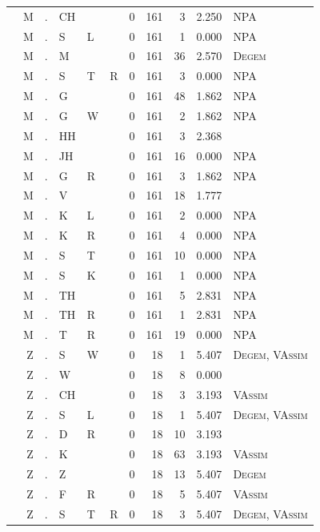 \documentclass[12pt]{article}
\begin{document}
\begin{longtable}{r@{ } r@{ } c@{ } l@{ } l@{ } l@{ } r r r r l }
 & M & . & CH &  &  & 0 & 161 & 3 & 2.250 & \textsc{NPA} \\
 & M & . & S & L &  & 0 & 161 & 1 & 0.000 & \textsc{NPA} \\
 & M & . & M &  &  & 0 & 161 & 36 & 2.570 & \textsc{Degem} \\
 & M & . & S & T & R & 0 & 161 & 3 & 0.000 & \textsc{NPA} \\
 & M & . & G &  &  & 0 & 161 & 48 & 1.862 & \textsc{NPA} \\
 & M & . & G & W &  & 0 & 161 & 2 & 1.862 & \textsc{NPA} \\
 & M & . & HH &  &  & 0 & 161 & 3 & 2.368 &  \\
 & M & . & JH &  &  & 0 & 161 & 16 & 0.000 & \textsc{NPA} \\
 & M & . & G & R &  & 0 & 161 & 3 & 1.862 & \textsc{NPA} \\
 & M & . & V &  &  & 0 & 161 & 18 & 1.777 &  \\
 & M & . & K & L &  & 0 & 161 & 2 & 0.000 & \textsc{NPA} \\
 & M & . & K & R &  & 0 & 161 & 4 & 0.000 & \textsc{NPA} \\
 & M & . & S & T &  & 0 & 161 & 10 & 0.000 & \textsc{NPA} \\
 & M & . & S & K &  & 0 & 161 & 1 & 0.000 & \textsc{NPA} \\
 & M & . & TH &  &  & 0 & 161 & 5 & 2.831 & \textsc{NPA} \\
 & M & . & TH & R &  & 0 & 161 & 1 & 2.831 & \textsc{NPA} \\
 & M & . & T & R &  & 0 & 161 & 19 & 0.000 & \textsc{NPA} \\
 & Z & . & S & W &  & 0 & 18 & 1 & 5.407 & \textsc{Degem}, \textsc{VAssim} \\
 & Z & . & W &  &  & 0 & 18 & 8 & 0.000 &  \\
 & Z & . & CH &  &  & 0 & 18 & 3 & 3.193 & \textsc{VAssim} \\
 & Z & . & S & L &  & 0 & 18 & 1 & 5.407 & \textsc{Degem}, \textsc{VAssim} \\
 & Z & . & D & R &  & 0 & 18 & 10 & 3.193 &  \\
 & Z & . & K &  &  & 0 & 18 & 63 & 3.193 & \textsc{VAssim} \\
 & Z & . & Z &  &  & 0 & 18 & 13 & 5.407 & \textsc{Degem} \\
 & Z & . & F & R &  & 0 & 18 & 5 & 5.407 & \textsc{VAssim} \\
 & Z & . & S & T & R & 0 & 18 & 3 & 5.407 & \textsc{Degem}, \textsc{VAssim} \\

\end{longtable}
\end{document}
